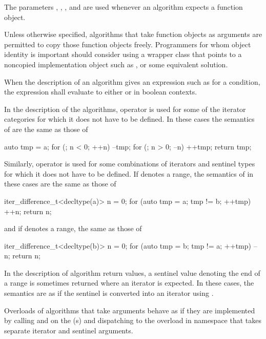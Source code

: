 \pnum
The parameters
,
,
,
and 
are used
whenever an algorithm expects a function object.

\pnum
\begin{note}
Unless otherwise specified, algorithms that take function objects as arguments
are permitted to copy those function objects freely.
Programmers for whom object identity is important should consider
using a wrapper class that points to a noncopied implementation object
such as , or some equivalent solution.
\end{note}

\pnum
When the description of an algorithm gives an expression such as
 for a condition, the expression
shall evaluate to either  or  in boolean contexts.

\pnum
In the description of the algorithms, operator \tcode{+}
is used for some of the iterator categories
for which it does not have to be defined.
In these cases the semantics of  are the same as those of
\begin{codeblock}
auto tmp = a;
for (; n < 0; ++n) --tmp;
for (; n > 0; --n) ++tmp;
return tmp;
\end{codeblock}
Similarly, operator \tcode{-} is used
for some combinations of iterators and sentinel types
for which it does not have to be defined.
If  denotes a range,
the semantics of  in these cases are the same as those of
\begin{codeblock}
iter_difference_t<decltype(a)> n = 0;
for (auto tmp = a; tmp != b; ++tmp) ++n;
return n;
\end{codeblock}
and if  denotes a range, the same as those of
\begin{codeblock}
iter_difference_t<decltype(b)> n = 0;
for (auto tmp = b; tmp != a; ++tmp) --n;
return n;
\end{codeblock}

\pnum
In the description of algorithm return values,
a sentinel value  denoting the end of a range 
is sometimes returned where an iterator is expected.
In these cases,
the semantics are as if the sentinel is converted into an iterator using
.

\pnum
Overloads of algorithms that take  arguments
behave as if they are implemented by calling  and
 on the (s) and
dispatching to the overload in namespace 
that takes separate iterator and sentinel arguments.

